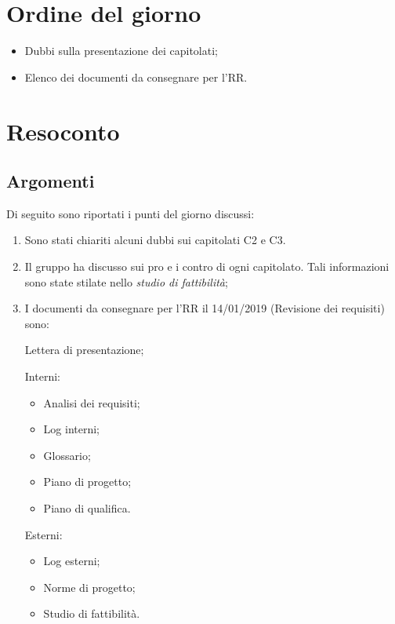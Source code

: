 \documentclass[12pt]{article}
\begin{document}
\section{Ordine del giorno}
    \begin{itemize}
        \item Dubbi sulla presentazione dei capitolati;
        \item Elenco dei documenti da consegnare per l'RR.
    \end{itemize}
    
    \newpage
\section{Resoconto}
    \subsection{Argomenti}
        Di seguito sono riportati i punti del giorno discussi:
    \begin{enumerate}
        \item Sono stati chiariti alcuni dubbi sui capitolati C2 e C3.
        \item Il gruppo ha discusso sui pro e i contro di ogni capitolato. Tali informazioni sono state stilate nello \textit{studio di fattibilità};
        \item I documenti da consegnare per l'RR il 14/01/2019 (Revisione dei requisiti) sono:
            
            Lettera di presentazione;
            
            Interni:
            \begin{itemize}
            \item Analisi dei requisiti;
            \item Log interni;
            \item Glossario;
            \item Piano di progetto;
            \item Piano di qualifica.
            \end{itemize}
            
            Esterni:
            \begin{itemize}
            \item Log esterni;
            \item Norme di progetto;
            \item Studio di fattibilità.
            \end{itemize}
    \end{enumerate}
\end{document}
